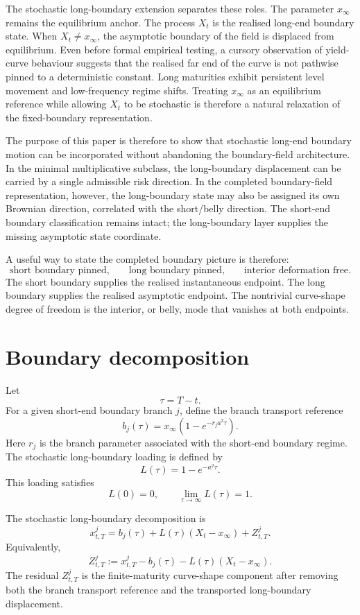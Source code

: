 \documentclass[11pt]{article}
\begin{document}
The stochastic long-boundary extension separates these roles. The parameter \(x_\infty\) remains the equilibrium anchor. The process \(X_t\) is the realised long-end boundary state. When \(X_t\neq x_\infty\), the asymptotic boundary of the field is displaced from equilibrium. Even before formal empirical testing, a cursory observation of yield-curve behaviour suggests that the realised far end of the curve is not pathwise pinned to a deterministic constant. Long maturities exhibit persistent level movement and low-frequency regime shifts. Treating \(x_\infty\) as an equilibrium reference while allowing \(X_t\) to be stochastic is therefore a natural relaxation of the fixed-boundary representation.

The purpose of this paper is therefore to show that stochastic long-end boundary motion can be incorporated without abandoning the boundary-field architecture. In the minimal multiplicative subclass, the long-boundary displacement can be carried by a single admissible risk direction. In the completed boundary-field representation, however, the long-boundary state may also be assigned its own Brownian direction, correlated with the short/belly direction. The short-end boundary classification remains intact; the long-boundary layer supplies the missing asymptotic state coordinate.

A useful way to state the completed boundary picture is therefore:
\[
\text{short boundary pinned,}
\qquad
\text{long boundary pinned,}
\qquad
\text{interior deformation free.}
\]
The short boundary supplies the realised instantaneous endpoint. The long boundary supplies the realised asymptotic endpoint. The nontrivial curve-shape degree of freedom is the interior, or belly, mode that vanishes at both endpoints.

\section{Boundary decomposition}

Let
\[
\tau=T-t.
\]
For a given short-end boundary branch \(j\), define the branch transport reference
\[
b_j(\tau)
=
x_\infty\left(1-e^{-r_j a^2\tau}\right).
\]
Here \(r_j\) is the branch parameter associated with the short-end boundary regime. The stochastic long-boundary loading is defined by
\[
L(\tau)
=
1-e^{-a^2\tau}.
\]
This loading satisfies
\[
L(0)=0,
\qquad
\lim_{\tau\to\infty}L(\tau)=1.
\]

The stochastic long-boundary decomposition is
\[
x^j_{t,T}
=
b_j(\tau)
+
L(\tau)(X_t-x_\infty)
+
Z^j_{t,T}.
\]
Equivalently,
\[
Z^j_{t,T}
:=
x^j_{t,T}
-
b_j(\tau)
-
L(\tau)(X_t-x_\infty).
\]
The residual \(Z^j_{t,T}\) is the finite-maturity curve-shape component after removing both the branch transport reference and the transported long-boundary displacement.
\end{document}
